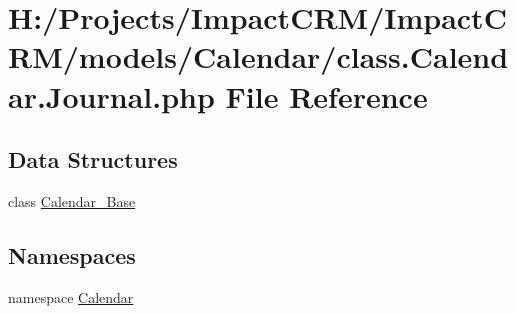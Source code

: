 \hypertarget{class_8Calendar_8Journal_8php}{
\section{H:/Projects/ImpactCRM/ImpactCRM/models/Calendar/class.Calendar.Journal.php File Reference}
\label{class_8Calendar_8Journal_8php}
}
\subsection*{Data Structures}
\begin{DoxyCompactItemize}
\item 
class \hyperlink{classCalendar__Base}{Calendar\_\-Base}
\end{DoxyCompactItemize}
\subsection*{Namespaces}
\begin{DoxyCompactItemize}
\item 
namespace \hyperlink{namespaceCalendar}{Calendar}
\end{DoxyCompactItemize}
